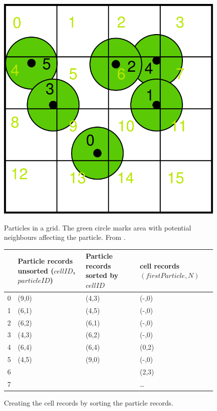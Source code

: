 \documentclass[a4paper,report]{IEEEtran}
\begin{document}
\begin{figure}
	\begin{minipage}{0.25\linewidth}
		\centering
		\includegraphics[width=1\linewidth]{grid}
		\caption{Particles in a grid. The green circle marks area with potential neighbours affecting the particle. From \cite{Articles:Green}.}
		\label{fig:grid}
\end{minipage}\hfill
\begin{minipage}{0.7\linewidth}
    \centering

		\begin{tabularx}{1\linewidth}{|c||X|X||X|}
			\hline
			 & Particle records unsorted \newline ($cellID$, $particleID$) & Particle records \newline sorted by $cellID$ & cell records \newline $(firstParticle, N)$ \\
			\hline
			\hline
			0 & (9,0) & (4,3) & (-,0) \\
			1 & (6,1) & (4,5) & (-,0) \\
			2 & (6,2) & (6,1) & (-,0) \\
			3 & (4,3) & (6,2) & (-,0) \\
			4 & (6,4) & (6,4) & (0,2) \\
			5 & (4,5) & (9,0) & (-,0) \\
			6 &       &       & (2,3) \\
			7 &       &       & \dots \\
			\hline
		\end{tabularx}
		\caption{Creating the cell records by sorting the particle records.}
		\label{fig:gridTable}
	\end{minipage}
\end{figure}
\end{document}

